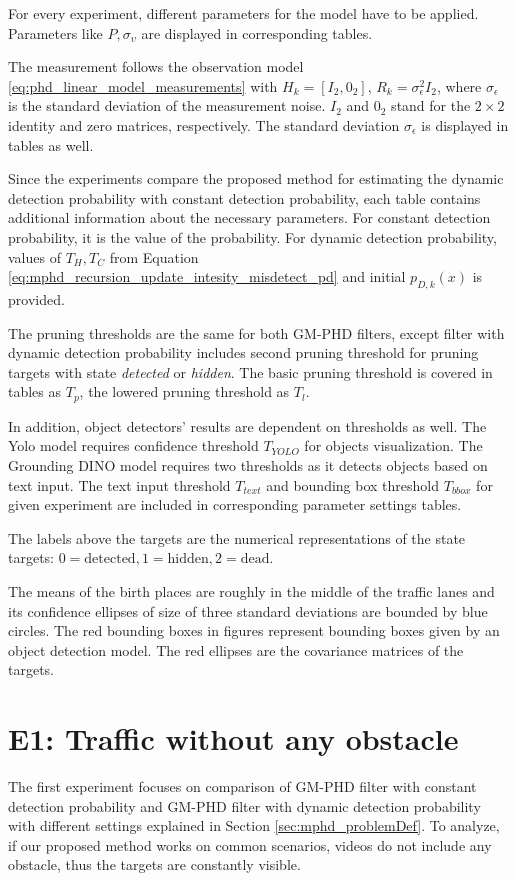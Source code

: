 For every experiment, different parameters for the model have to be applied. Parameters like $P, \sigma_{\upsilon}$
are displayed in corresponding tables.

The measurement follows the observation model \eqref{eq:phd_linear_model_measurements} with $H_k = [I_2, 0_2]$, $R_k
= \sigma_{\epsilon}^2I_2$, where $ \sigma_{\epsilon}$ is the standard deviation of the measurement noise.  $I_2$ and $0_2$ stand for
the $2\times 2$ identity and zero matrices, respectively.
The standard deviation $\sigma_{\epsilon}$ is displayed in tables as well.

Since the experiments compare the proposed method for estimating the dynamic detection probability with constant
detection probability, each table contains additional information about the necessary parameters. For constant
detection probability, it is the value of the probability. For dynamic detection probability, values of $T_H, T_C$
from Equation \eqref{eq:mphd_recursion_update_intesity_misdetect_pd}
and initial $p_{D,k}(x)$ is provided.

The pruning thresholds are the same for both GM-PHD filters, except filter with dynamic detection probability
includes second pruning threshold for pruning targets with state \textit{detected} or \textit{hidden}. The basic
pruning threshold is covered in tables as $T_p$, the lowered pruning threshold as $T_l$.

In addition, object detectors' results are dependent on thresholds as well. The Yolo model requires confidence threshold $T_{YOLO}$ for objects visualization. The Grounding DINO model requires two thresholds as it detects objects based on text input. The text input threshold $T_{text}$ and bounding box threshold $T_{bbox}$ for given experiment are included in corresponding parameter settings tables.

The labels above
the targets are the numerical representations of the state targets: $0=\text{detected}, 1=\text{hidden}, 2=\text{dead}$.

The means of the birth places are roughly in the middle of the traffic lanes and its confidence ellipses of size of
three standard
deviations are bounded by blue circles. The red bounding boxes in figures represent bounding
boxes
given by an object detection model. The red ellipses are the covariance matrices of the targets.


\section{E1: Traffic without any obstacle}
The first experiment focuses on comparison of GM-PHD filter with constant detection probability and GM-PHD filter
with dynamic detection probability with different settings explained in Section \ref{sec:mphd_problemDef}. To analyze,
if our proposed method works on common scenarios, videos do not include any obstacle, thus the targets are
constantly visible.




